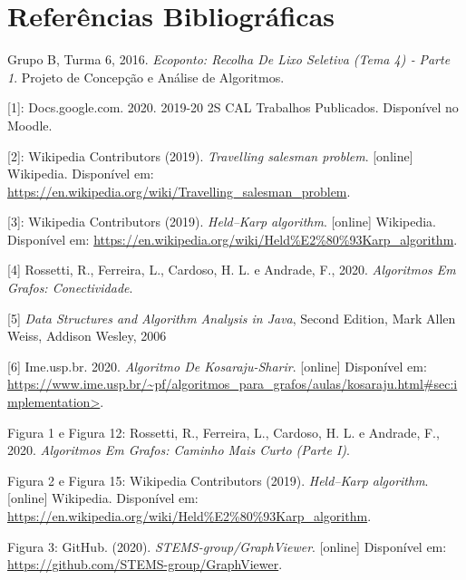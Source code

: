 \documentclass[article, a4paper, 12pt, oneside]{memoir}
\begin{document}
\chapter[Referências Bibliográficas][Referências Bibliográficas]{Referências Bibliográficas} \label{\thechapter}
Grupo B, Turma 6, 2016. \textit{Ecoponto: Recolha De Lixo Seletiva (Tema 4) ‐ Parte 1}. Projeto de Concepção e Análise de Algoritmos.

[1]: Docs.google.com. 2020. 2019-20 2S CAL Trabalhos Publicados. Disponível no Moodle.

[2]: Wikipedia Contributors (2019). \textit{Travelling salesman problem}. [online] Wikipedia. Disponível em: \url{https://en.wikipedia.org/wiki/Travelling_salesman_problem}.

[3]: Wikipedia Contributors (2019). \textit{Held–Karp algorithm}. [online] Wikipedia. Disponível em: \url{https://en.wikipedia.org/wiki/Held%E2%80%93Karp_algorithm}.

[4] Rossetti, R., Ferreira, L., Cardoso, H. L. e Andrade, F., 2020. \textit{Algoritmos Em Grafos: Conectividade}.

[5] \textit{Data Structures and Algorithm Analysis in Java}, Second
Edition, Mark Allen Weiss, Addison Wesley, 2006 

[6] Ime.usp.br. 2020. \textit{Algoritmo De Kosaraju-Sharir}. [online] Disponível em: \url{https://www.ime.usp.br/~pf/algoritmos_para_grafos/aulas/kosaraju.html#sec:implementation>}.

Figura 1 e Figura 12: Rossetti, R., Ferreira, L., Cardoso, H. L. e Andrade, F., 2020. \textit{Algoritmos Em Grafos: Caminho Mais Curto (Parte I)}.

Figura 2 e Figura 15: Wikipedia Contributors (2019). \textit{Held–Karp algorithm}. [online] Wikipedia. Disponível em: \url{https://en.wikipedia.org/wiki/Held%E2%80%93Karp_algorithm}.

Figura 3: GitHub. (2020). \textit{STEMS-group/GraphViewer}. [online] Disponível em: \url{https://github.com/STEMS-group/GraphViewer}.

‌

‌

\newpage
\end{document}
